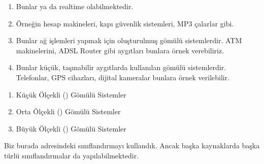 \documentclass[letterpaper,10pt,turkish]{sphinxmanual}
\begin{document}
\sphinxAtStartPar
{}
\begin{enumerate}
%
\item {} 
\sphinxAtStartPar
{} Bunlar  ya da
 real\sphinxhyphen{}time olabilmektedir.

\item {} 
\sphinxAtStartPar
{}
Örneğin hesap makineleri, kapı güvenlik sistemleri, MP3 çalarlar gibi.

\item {} 
\sphinxAtStartPar
{} Bunlar ağ işlemleri yapmak için
oluşturulmuş gömülü sistemlerdir. ATM makinelerini, ADSL Router gibi aygıtları bunlara
örnek verebiliriz.

\item {} 
\sphinxAtStartPar
{} Bunlar küçük, taşınabilir aygıtlarda
kullanılan gömülü sistemlerdir. Telefonlar, GPS cihazları, dijital kameralar bunlara örnek
verilebilir.

\end{enumerate}

\sphinxAtStartPar
{}
\begin{enumerate}
%
\item {} 
\sphinxAtStartPar
Küçük Ölçekli () Gömülü Sistemler

\item {} 
\sphinxAtStartPar
Orta Ölçekli () Gömülü Sistemler

\item {} 
\sphinxAtStartPar
Büyük Ölçekli () Gömülü Sistemler

\end{enumerate}

\sphinxAtStartPar
Biz burada 
adresindeki sınıflandırmayı kullandık. Ancak başka kaynaklarda başka türlü sınıflandırmalar da
yapılabilmektedir.
\end{document}
